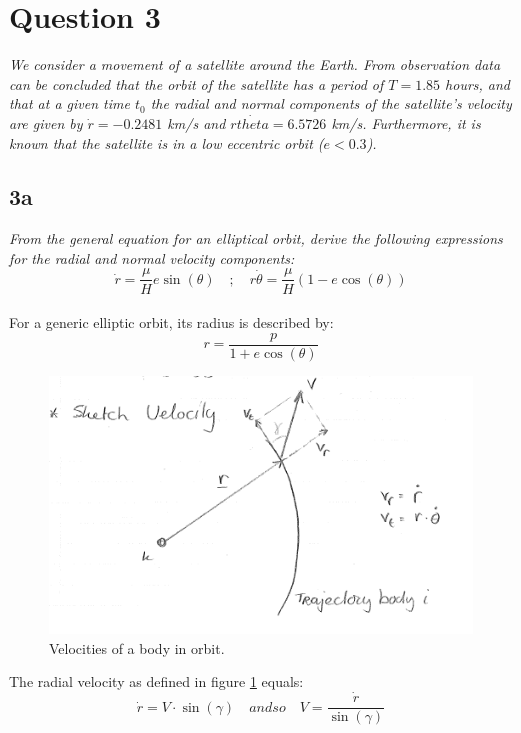 \section{Question 3}\label{sec:q3}    

\textit{We consider a movement of a satellite around the Earth. From observation data can be concluded that the orbit of the satellite has a period of $T = 1.85$ hours, and that at a given time $t_0$ the radial and normal components of the satellite's velocity are given by $\dot{r} = -0.2481$ km/s and $r\dot{theta} = 6.5726$ km/s. Furthermore, it is known that the satellite is in a low eccentric orbit ($e < 0.3$).}

\subsection{3a}
\textit{From the general equation for an elliptical orbit, derive the following expressions for the radial and normal velocity components:} 
\begin{equation}
    \dot{r}=\dfrac {\mu }{H}e\sin \left( \theta \right) \quad ; \quad r\dot{\theta} =\dfrac {\mu }{H}\left( 1-e\cos \left( \theta \right) \right) 
\end{equation} \\

For a generic elliptic orbit, its radius is described by:
\begin{equation} \label{eq:elliptic}
    r = \frac{p}{1+e \cos(\theta)}
\end{equation}

\begin{figure}[H]
    \centering
    \includegraphics[width=0.5\columnwidth]{Figures/3a.png}
    \caption{Velocities of a body in orbit.}
    \label{fig:3a}
\end{figure}

The radial velocity as defined in figure \ref{fig:3a} equals:
\begin{equation}
    \dot{r}=V\cdot \sin \left( \gamma \right) \quad and so \quad V=\dfrac {\dot{r}}{\sin \left( \gamma \right) }
\end{equation}

